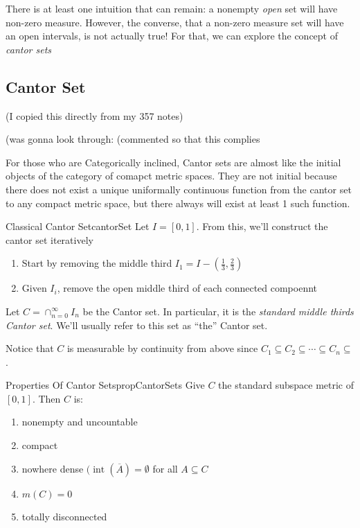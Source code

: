 \documentclass[oneside]{book}
\newcommand{\sse}{\subseteq}
\newcommand{\oln}{\overline}
\begin{document}
There is at least one intuition that can remain: a nonempty \emph{open} set will have non-zero measure. However, the
converse, that a non-zero measure set will have an open intervals, is not actually true! For that, we can explore the
concept of \emph{cantor sets}

\subsection*{Cantor Set}
(I copied this directly from my 357 notes)

(was gonna look through: (commented so that this complies%

For those who are Categorically inclined, Cantor sets are almost like the initial objects of the category of comapct metric spaces. They are not initial because
there does not exist a unique uniformally continuous function from the cantor set to any compact metric space, but there
always will exist at least 1 such function. 

\begin{defn}{Classical Cantor Set}{cantorSet}
	Let $I = [0,1]$. From this, we'll construct the cantor set iteratively
	\begin{enumerate}
		\item Start by removing the middle third $I_1 = I - \left(\frac{1}{3}, \frac{2}{3}\right)$
		\item Given $I_i$, remove the open middle third of each connected compoennt
	\end{enumerate}
	Let $C = \cap_{n=0}^\infty I_n$ be the Cantor set. In particular, it is the \emph{standard middle thirds Cantor
	set}. We'll usually refer to this set as ``the'' Cantor set.
\end{defn}

Notice that $C$ is measurable by continuity from above since $C_1 \sse C_2 \sse \cdots \sse C_n \sse$. 

\begin{prop}{Properties Of Cantor Sets}{propCantorSets}
	Give $C$ the standard subspace metric of $[0,1]$. Then $C$ is:
	\begin{enumerate}
		\item nonempty and uncountable
		\item compact
		\item nowhere dense $(\operatorname{int}(\oln A) = \emptyset$ for all $A \sse C$
		\item $m(C) = 0$
		\item totally disconnected
	\end{enumerate}
\end{prop}
\end{document}
